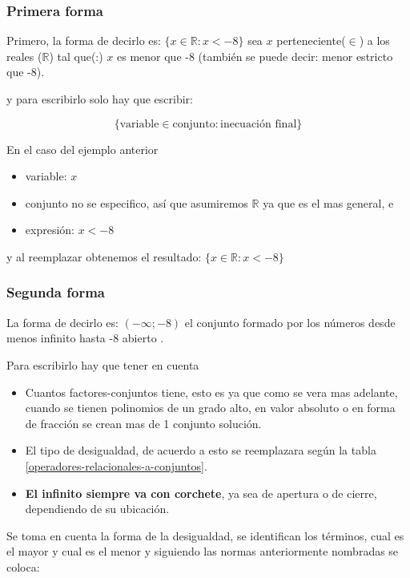     \subsubsection*{Primera forma}
    Primero, la forma de decirlo es: $\{x \in \mathbb{R}:x < -8\}$
    sea $x$ perteneciente($\in$) a los reales ($\mathbb{R}$) tal que(:)
    $x$ es menor que -8 (también se puede decir: menor estricto que -8).

    y para escribirlo solo hay que escribir:

    $$ \{ \text{variable} \in \text{conjunto} : \text{inecuación final}  \} $$

    En el caso del ejemplo anterior
   \begin{itemize}
        \item  variable: $x$
        \item conjunto no se especifico, así que asumiremos $\mathbb{R}$ ya que
            es el mas general, e
        \item expresión: $x<-8$
   \end{itemize}

    y al reemplazar obtenemos el resultado: $\{x \in \mathbb{R}:x < -8\}$

    \subsubsection*{Segunda forma} \label{Segunda-forma}
    La forma de decirlo es:  $(-\infty;-8)$ el conjunto formado por los números
    desde menos infinito hasta -8 abierto .

    Para escribirlo hay que tener en cuenta

    \begin{itemize}
        \item Cuantos factores-conjuntos tiene, esto es ya que como se vera mas adelante,
            cuando se tienen polinomios de un grado alto, en valor absoluto o en
            forma de fracción se crean mas de 1 conjunto solución.
        \item El tipo de desigualdad, de acuerdo a esto se reemplazara según la tabla
            \ref{operadores-relacionales-a-conjuntos}.
        \item \textbf{El infinito siempre va con corchete}, ya sea de apertura o de
            cierre, dependiendo de su ubicación.
    \end{itemize}

    Se toma en cuenta la forma de la desigualdad, se identifican los términos, cual
    es el mayor y cual es el menor y siguiendo las normas anteriormente
    nombradas se coloca:

